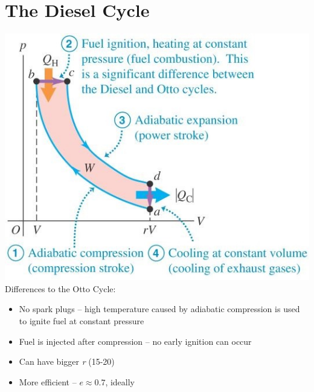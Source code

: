 \documentclass[a4paper, 11pt, fleqn, normalem]{report}
\begin{document}
 \section{The Diesel Cycle}
\includegraphics[scale=0.8]{Diesel.jpg}\\
Differences to the Otto Cycle:
\begin{itemize}
	\item No spark plugs -- high temperature caused by adiabatic compression is used to ignite fuel at constant pressure
	\item Fuel is injected after compression -- no early ignition can occur
	\item Can have bigger \emph{r} (15-20)
	\item More efficient -- $e \approx 0.7$, ideally
\end{itemize}
\end{document}
